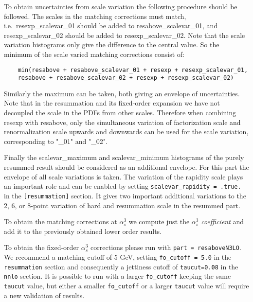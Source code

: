 To obtain uncertainties from scale variation the following procedure
should be followed. The scales in the matching corrections must match,
i.e.~resexp\_scalevar\_01 should be added to resabove\_scalevar\_01, and
resexp\_scalevar\_02 should be added to resexp\_scalevar\_02. Note that
the scale variation histograms only give the difference to the central
value. So the minimum of the scale varied matching corrections consist
of:

\begin{verbatim}
	min(resabove + resabove_scalevar_01 + resexp + resexp_scalevar_01,
	resabove + resabove_scalevar_02 + resexp + resexp_scalevar_02)
\end{verbatim}

Similarly the maximum can be taken, both giving an envelope of
uncertainties. Note that in the resummation and its fixed-order
expansion we have not decoupled the scale in the PDFs from other scales.
Therefore when combining resexp with resabove, only the simultaneous
variation of factorization scale and renormalization scale upwards and
downwards can be used for the scale variation, corresponding to "\_01"
and "\_02".

Finally the scalevar\_maximum and scalevar\_minimum histograms of the
purely resummed result should be considered as an additional envelope.
For this part the envelope of all scale variations is taken. The
variation of the rapidity scale plays an important role and can be
enabled by setting \texttt{scalevar\_rapidity\ =\ .true.} in the
\texttt{{[}resummation{]}} section. It gives two important additional
variations to the 2, 6, or 8-point variation of hard and resummation
scale in the resummed part.


To obtain the matching corrections at $\alpha_s^3$ we compute just the
$\alpha_s^3$ \emph{coefficient} and add it to the previously obtained
lower order results.



To obtain the fixed-order $\alpha_s^3$ corrections please run with
\texttt{part\ =\ resaboveN3LO}. We recommend a matching cutoff of 5 GeV,
setting \texttt{fo\_cutoff\ =\ 5.0} in the \texttt{resummation} section
and consequently a jettiness cutoff of \texttt{taucut=0.08} in the
\texttt{nnlo} section. It is possible to run with a larger
\texttt{fo\_cutoff} keeping the same \texttt{taucut} value, but either a
smaller \texttt{fo\_cutoff} or a larger \texttt{taucut} value will
require a new validation of results.



